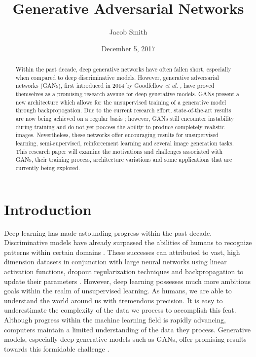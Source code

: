 \documentclass[11pt]{article}
\title{Generative Adversarial Networks}
\author{Jacob Smith}
\date{December 5, 2017}
\begin{document}
\maketitle

\begin{abstract}
    Within the past decade, deep generative networks have often fallen short, especially when compared to deep discriminative models. However, generative adversarial networks (GANs), first introduced in 2014 by Goodfellow \textit{et al.} \citep{2014arXiv1406.2661G}, have proved themselves as a promising research avenue for deep generative models. GANs present a new architecture which allows for the unsupervised training of a generative model through backpropogation. Due to the current research effort, state-of-the-art results are now being achieved on a regular basis \citep{2017arXiv171010196K, 2017arXiv171111585W}; however, GANs still encounter instability during training and do not yet poccess the ability to produce completely realistic images. Nevertheless, these networks offer encouraging results for unsupervised learning, semi-supervised, reinforcement learning and several image generation tasks. This research paper will examine the motivations and challenges associated with GANs, their training process, architecture variations and some applications that are currently being explored.
\end{abstract}

\section{Introduction}
Deep learning has made astounding progress within the past decade. Discriminative models have already surpassed the abilities of humans to recognize patterns within certain domains \citep{2014arXiv1404.7828S}. These successes can attributed to vast, high dimension datasets in conjunction with large neural networks using linear activation functions, dropout regularization techniques and backpropagation to update their parameters \citep{2014arXiv1406.2661G}. However, deep learning possesses much more ambitious goals within the realm of unsupervised learning. As humans, we are able to understand the world around us with tremendous precision. It is easy to underestimate the complexity of the data we process to accomplish this feat. Although progress within the machine learning field is rapidly advancing, computers maintain a limited understanding of the data they process. Generative models, especially deep generative models such as GANs, offer promising results towards this formidable challenge \citep{genmodelingopenai}.
\end{document}
